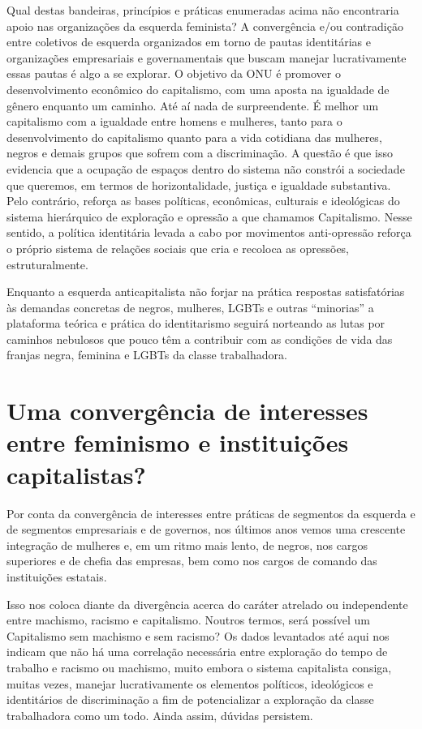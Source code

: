 Qual destas bandeiras, princípios e práticas enumeradas acima não
encontraria apoio nas organizações da esquerda feminista? A convergência
e/ou contradição entre coletivos de esquerda organizados em torno de
pautas identitárias e organizações empresariais e governamentais que
buscam manejar lucrativamente essas pautas é algo a se explorar. O
objetivo da ONU é promover o desenvolvimento econômico do capitalismo,
com uma aposta na igualdade de gênero enquanto um caminho. Até aí nada
de surpreendente. É melhor um capitalismo com a igualdade entre homens e
mulheres, tanto para o desenvolvimento do capitalismo quanto para a vida
cotidiana das mulheres, negros e demais grupos que sofrem com a
discriminação. A questão é que isso evidencia que a ocupação de espaços
dentro do sistema não constrói a sociedade que queremos, em termos de
horizontalidade, justiça e igualdade substantiva. Pelo contrário,
reforça as bases políticas, econômicas, culturais e ideológicas do
sistema hierárquico de exploração e opressão a que chamamos Capitalismo.
Nesse sentido, a política identitária levada a cabo por movimentos
anti-opressão reforça o próprio sistema de relações sociais que cria e
recoloca as opressões, estruturalmente.

Enquanto a esquerda anticapitalista não forjar na prática respostas
satisfatórias às demandas concretas de negros, mulheres, LGBTs e outras
``minorias'' a plataforma teórica e prática do identitarismo seguirá
norteando as lutas por caminhos nebulosos que pouco têm a contribuir com
as condições de vida das franjas negra, feminina e LGBTs da classe
trabalhadora.

\chapter{Uma convergência de interesses entre feminismo e instituições capitalistas?}

Por conta da convergência de interesses entre práticas de segmentos da
esquerda e de segmentos empresariais e de governos, nos últimos anos
vemos uma crescente integração de mulheres e, em um ritmo mais lento, de
negros, nos cargos superiores e de chefia das empresas, bem como nos
cargos de comando das instituições estatais.

Isso nos coloca diante da divergência acerca do caráter atrelado ou
independente entre machismo, racismo e capitalismo. Noutros termos, será
possível um Capitalismo sem machismo e sem racismo? Os dados levantados
até aqui nos indicam que não há uma correlação necessária entre
exploração do tempo de trabalho e racismo ou machismo, muito embora o
sistema capitalista consiga, muitas vezes, manejar lucrativamente os
elementos políticos, ideológicos e identitários de discriminação a fim
de potencializar a exploração da classe trabalhadora como um todo. Ainda
assim, dúvidas persistem.

